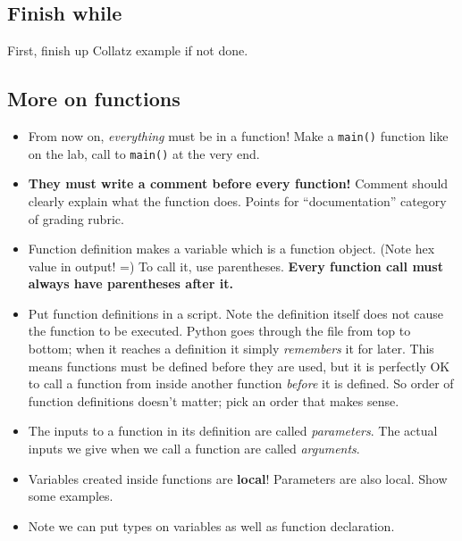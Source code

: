 \documentclass{article}
\begin{document}
\subsection*{Finish while}

First, finish up Collatz example if not done.

\subsection*{More on functions}

\begin{itemize}
\item From now on, \emph{everything} must be in a function!  Make a
  \verb|main()| function like on the lab, call to \verb|main()| at the
  very end.

\item \textbf{They must write a comment before every function!}
  Comment should clearly explain what the function does.  Points for
  ``documentation'' category of grading rubric.

\item Function definition makes a variable which is a function
  object. (Note hex value in output! =) To call it, use parentheses.
  \textbf{Every function call must always have parentheses after it.}

\item Put function definitions in a script.  Note the definition
  itself does not cause the function to be executed.  Python goes
  through the file from top to bottom; when it reaches a definition it
  simply \emph{remembers} it for later.  This means functions must be
  defined before they are used, but it is perfectly OK to call a
  function from inside another function \emph{before} it is defined.
  So order of function definitions doesn't matter; pick an order that
  makes sense.

\item The inputs to a function in its definition are called
  \emph{parameters}.  The actual inputs we give when we call a
  function are called \emph{arguments}.

\item Variables created inside functions are \textbf{local}!
  Parameters are also local.  Show some examples.

\item Note we can put types on variables as well as function
  declaration.
\end{itemize}
\end{document}
